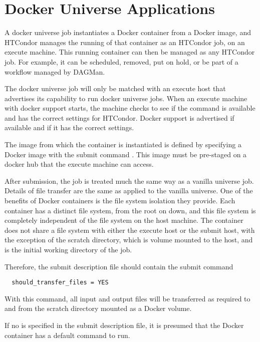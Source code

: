 \section{\label{sec:dockeruniverse}Docker Universe Applications}
A docker universe job instantiates a Docker container
from a Docker image, and HTCondor manages the running
of that container as an HTCondor job, on an execute machine.
This running container can then be managed as any HTCondor job.
For example, it can be scheduled, removed, put on hold, 
or be part of a workflow managed by DAGMan.

The docker universe job will only be matched with an execute host
that advertises its capability to run docker universe jobs.
When an execute machine with docker support starts, 
the machine checks to
see if the  command is available and has the correct
settings for HTCondor.  
Docker support is advertised if available and if it has the correct settings.

The image from which the container is instantiated is
defined by specifying a Docker image with the submit command
.  
This image must be pre-staged on a docker
hub that the execute machine can access.

After submission, the job is treated much the same way as a vanilla 
universe job.  
Details of file transfer are the same as applied to 
the vanilla universe.  
One of the benefits of Docker containers is 
the file system isolation they provide.  
Each container has a distinct file system, 
from the root on down, and this file
system is completely independent of the file system on the host machine.
The container does not share a file system with either the execute
host or the submit host, with the exception of the scratch directory,
which is volume mounted to the host, and is the initial working
directory of the job.

Therefore,
the submit description file should contain the submit command
\begin{verbatim}
  should_transfer_files = YES
\end{verbatim}
With this command,  all input and output files will be transferred
as required to and from the scratch directory mounted as a
Docker volume.

If no  is specified in the submit description file,
it is presumed that the Docker container has a default command to run.

